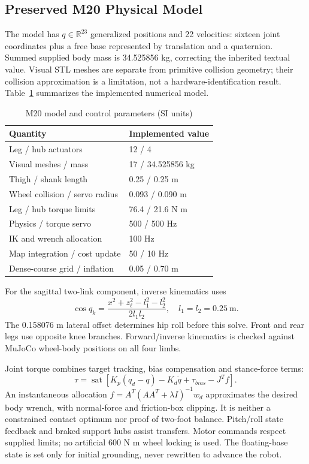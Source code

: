 \documentclass[conference]{IEEEtran}
\begin{document}
\subsection{Preserved M20 Physical Model}
The model has $q\in\mathbb{R}^{23}$ generalized positions and 22 velocities: sixteen joint coordinates plus a free base represented by translation and a quaternion. Summed supplied body mass is 34.525856 kg, correcting the inherited textual value. Visual STL meshes are separate from primitive collision geometry; their collision approximation is a limitation, not a hardware-identification result. Table~\ref{tab:model} summarizes the implemented numerical model.

\begin{table}[t]
\caption{M20 model and control parameters (SI units)}\label{tab:model}
\centering\begin{tabular}{ll}\toprule
Quantity & Implemented value\\\midrule
Leg / hub actuators & 12 / 4\\
Visual meshes / mass & 17 / 34.525856 kg\\
Thigh / shank length & 0.25 / 0.25 m\\
Wheel collision / servo radius & 0.093 / 0.090 m\\
Leg / hub torque limits & 76.4 / 21.6 N m\\
Physics / torque servo & 500 / 500 Hz\\
IK and wrench allocation & 100 Hz\\
Map integration / cost update & 50 / 10 Hz\\
Dense-course grid / inflation & 0.05 / 0.70 m\\\bottomrule
\end{tabular}
\end{table}

For the sagittal two-link component, inverse kinematics uses
\begin{equation}
\cos q_k=\frac{x^2+z_{\ell}^2-l_1^2-l_2^2}{2l_1l_2},\quad l_1=l_2=0.25\ \mathrm{m}.
\end{equation}
The 0.158076 m lateral offset determines hip roll before this solve. Front and rear legs use opposite knee branches. Forward/inverse kinematics is checked against MuJoCo wheel-body positions on all four limbs.

Joint torque combines target tracking, bias compensation and stance-force terms:
\begin{equation}
\tau=\operatorname{sat}\!\left[K_p(q_d-q)-K_d\dot q+\tau_{bias}-J^Tf\right].
\end{equation}
An instantaneous allocation $f=A^T(AA^T+\lambda I)^{-1}w_d$ approximates the desired body wrench, with normal-force and friction-box clipping. It is neither a constrained contact optimum nor proof of two-foot balance. Pitch/roll state feedback and braked support hubs assist transfers. Motor commands respect supplied limits; no artificial 600 N m wheel locking is used. The floating-base state is set only for initial grounding, never rewritten to advance the robot.
\end{document}
